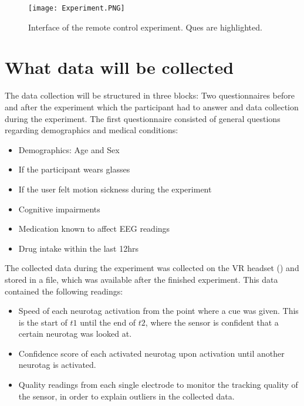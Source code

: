             \begin{figure}[h]     %
                \centering
                \texttt{[image: Experiment.PNG]} 
                \caption{Interface of the remote control experiment. Ques are highlighted.}\label{gui-remote}
            \end{figure}  

        \section{What data will be collected}\label{datacollection}

            The data collection will be structured in three blocks: Two questionnaires before and after the experiment which the participant had to answer and data collection during the experiment. The first questionnaire consisted of general questions regarding demographics and medical conditions:

            \begin{itemize}
                \item Demographics: Age and Sex
                \item If the participant wears glasses
                \item If the user felt motion sickness during the experiment
                \item Cognitive impairments
                \item Medication known to affect EEG readings
                \item Drug intake within the last 12hrs
            \end{itemize}

            The collected data during the experiment was collected on the VR headset () and stored in a file, which was available after the finished experiment. This data contained the following readings:

            \begin{itemize}
                \item Speed of each neurotag activation from the point where a cue was given. This is the start of $t1$ until the end of $t2$, where the sensor is confident that a certain neurotag was looked at.
                \item Confidence score of each activated neurotag upon activation until another neurotag is activated.
                \item Quality readings from each single electrode to monitor the tracking quality of the sensor, in order to explain outliers in the collected data.
            \end{itemize}
            
